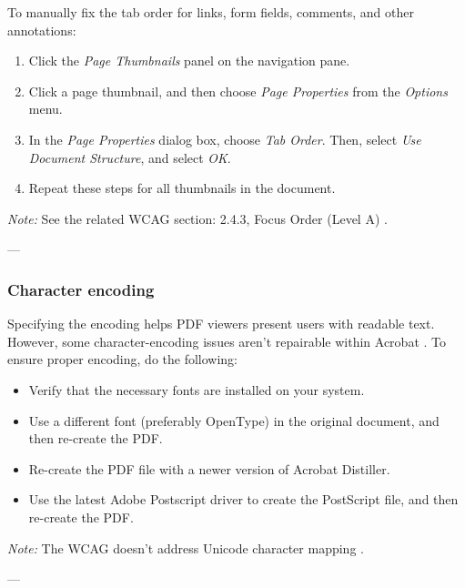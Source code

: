 To manually fix the tab order for links, form fields, comments, and other annotations:
\begin{enumerate}
    \item Click the \emph{Page Thumbnails} panel on the navigation pane.
    \item Click a page thumbnail, and then choose \emph{Page Properties} from the \emph{Options} menu.
    \item In the \emph{Page Properties} dialog box, choose \emph{Tab Order}. Then, select \emph{Use Document Structure}, and select \emph{OK}.
    \item Repeat these steps for all thumbnails in the document.
\end{enumerate}

\vspace{0.5em}
\noindent\textit{Note:} See the related WCAG section: 2.4.3, Focus Order (Level A) \cite{WCAG}.

---

\subsubsection{Character encoding}
\label{subsubsec:acrobat-character-encoding}
Specifying the encoding helps PDF viewers present users with readable text. However, some character-encoding issues aren't repairable within Acrobat \cite{AdobeHelpX}.
To ensure proper encoding, do the following:
\begin{itemize}
    \item Verify that the necessary fonts are installed on your system.
    \item Use a different font (preferably OpenType) in the original document, and then re-create the PDF.
    \item Re-create the PDF file with a newer version of Acrobat Distiller.
    \item Use the latest Adobe Postscript driver to create the PostScript file, and then re-create the PDF.
\end{itemize}

\vspace{0.5em}
\noindent\textit{Note:} The WCAG doesn't address Unicode character mapping \cite{WCAG}.

---

